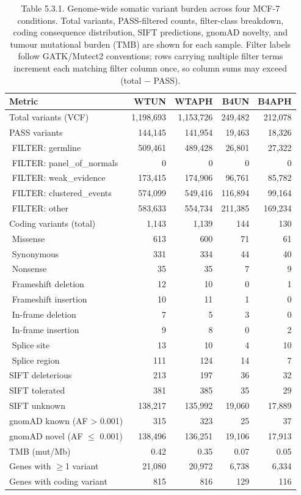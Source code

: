 \begin{table}[ht]
\centering
\small
\caption{Table 5.3.1. Genome-wide somatic variant burden across four MCF-7 conditions. Total variants, PASS-filtered counts, filter-class breakdown, coding consequence distribution, SIFT predictions, gnomAD novelty, and tumour mutational burden (TMB) are shown for each sample. Filter labels follow GATK/Mutect2 conventions; rows carrying multiple filter terms increment each matching filter column once, so column sums may exceed (total $-$ PASS).}
\label{tab:ch5-variant-burden}
\begin{tabular}{lrrrr}
\hline
Metric & WTUN & WTAPH & B4UN & B4APH \\
\hline
Total variants (VCF) & 1,198,693 & 1,153,726 & 249,482 & 212,078 \\
PASS variants & 144,145 & 141,954 & 19,463 & 18,326 \\
\,\,FILTER: germline & 509,461 & 489,428 & 26,801 & 27,322 \\
\,\,FILTER: panel\_of\_normals & 0 & 0 & 0 & 0 \\
\,\,FILTER: weak\_evidence & 173,415 & 174,906 & 96,761 & 85,782 \\
\,\,FILTER: clustered\_events & 574,099 & 549,416 & 116,894 & 99,164 \\
\,\,FILTER: other & 583,633 & 554,734 & 211,385 & 169,234 \\
Coding variants (total) & 1,143 & 1,139 & 144 & 130 \\
\,\,Missense & 613 & 600 & 71 & 61 \\
\,\,Synonymous & 331 & 334 & 44 & 40 \\
\,\,Nonsense & 35 & 35 & 7 & 9 \\
\,\,Frameshift deletion & 12 & 10 & 0 & 1 \\
\,\,Frameshift insertion & 10 & 11 & 1 & 0 \\
\,\,In-frame deletion & 7 & 5 & 3 & 0 \\
\,\,In-frame insertion & 9 & 8 & 0 & 2 \\
\,\,Splice site & 13 & 10 & 4 & 10 \\
\,\,Splice region & 111 & 124 & 14 & 7 \\
SIFT deleterious & 213 & 197 & 36 & 32 \\
SIFT tolerated & 381 & 385 & 35 & 29 \\
SIFT unknown & 138,217 & 135,992 & 19,060 & 17,889 \\
gnomAD known (AF > 0.001) & 315 & 323 & 25 & 37 \\
gnomAD novel (AF $\le$ 0.001) & 138,496 & 136,251 & 19,106 & 17,913 \\
TMB (mut/Mb) & 0.42 & 0.35 & 0.07 & 0.05 \\
Genes with $\ge$1 variant & 21,080 & 20,972 & 6,738 & 6,334 \\
Genes with coding variant & 815 & 816 & 129 & 116 \\
\hline
\end{tabular}
\end{table}
